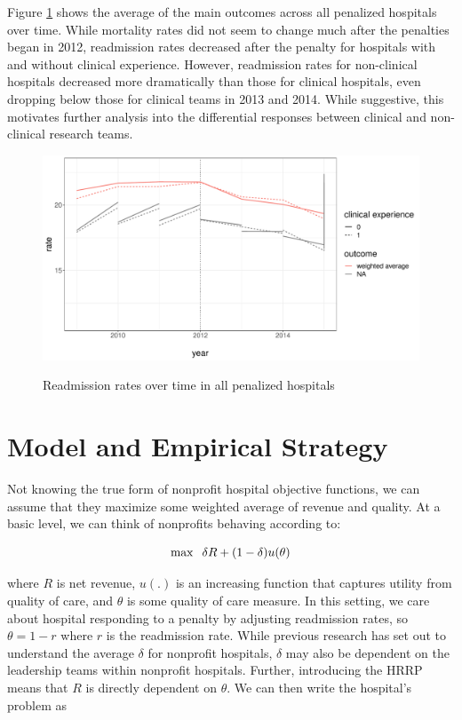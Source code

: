 \documentclass[12pt]{article}
\begin{document}
    Figure \ref{weighted_read_mort_graph} shows the average of the main outcomes across all penalized hospitals over time. While mortality rates did not seem to change much after the penalties began in 2012, readmission rates decreased after the penalty for hospitals with and without clinical experience. However, readmission rates for non-clinical hospitals decreased more dramatically than those for clinical hospitals, even dropping below those for clinical teams in 2013 and 2014. While suggestive, this motivates further analysis into the differential responses between clinical and non-clinical research teams. 

    \begin{figure}[h!]
        \centering
        \caption{Readmission rates over time in all penalized hospitals}
        \includegraphics[scale=.6]{Objects/weighted_read_mort_graph.pdf}
        \label{weighted_read_mort_graph}
    \end{figure}

    \section{Model and Empirical Strategy}

    Not knowing the true form of nonprofit hospital objective functions, we can assume that they maximize some weighted average of revenue and quality. At a basic level, we can think of nonprofits behaving according to:     
    
    $$\max\hspace{2mm} \delta R + (1-\delta) u(\theta)$$

    \noindent where $R$ is net revenue, $u(.)$ is an increasing function that captures utility from quality of care, and $\theta$ is some quality of care measure. In this setting, we care about hospital responding to a penalty by adjusting readmission rates, so $\theta = 1-r$ where $r$ is the readmission rate. While previous research has set out to understand the average $\delta$ for nonprofit hospitals, $\delta$ may also be dependent on the leadership teams within nonprofit hospitals. Further, introducing the HRRP means that $R$ is directly dependent on $\theta$. We can then write the hospital's problem as 
\end{document}
